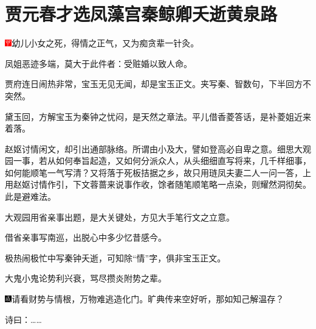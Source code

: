 

\chapter{贾元春才选凤藻宫\hspace{.5em}秦鲸卿夭逝黄泉路}

{\includegraphics[width=3mm]{../Images/00002}\kaishu 幼儿小女之死，得情之正气，又为痴贪辈一针灸。}

{\kaishu 凤姐恶迹多端，莫大于此件者：受赃婚以致人命。}

{\kaishu 贾府连日闹热非常，宝玉无见无闻，却是宝玉正文。夹写秦、智数句，下半回方不突然。}

{\kaishu 黛玉回，方解宝玉为秦钟之忧闷，是天然之章法。平儿借香菱答话，是补菱姐近来着落。}

{\kaishu 赵妪讨情闲文，却引出通部脉络。所谓由小及大，譬如登高必自卑之意。细思大观园一事，若从如何奉旨起造，又如何分派众人，从头细细直写将来，几千样细事，如何能顺笔一气写清？又将落于死板拮据之乡，故只用琏凤夫妻二人一问一答，上用赵妪讨情作引，下文蓉蔷来说事作收，馀者随笔顺笔略一点染，则耀然洞彻矣。此是避难法。}

{\kaishu 大观园用省亲事出题，是大关键处，方见大手笔行文之立意。}

{\kaishu 借省亲事写南巡，出脱心中多少忆昔感今。}

{\kaishu 极热闹极忙中写秦钟夭逝，可知除``情''字，俱非宝玉正文。}

{\kaishu 大鬼小鬼论势利兴衰，骂尽攒炎附势之辈。}

{\includegraphics[width=3mm]{../Images/00005}请看财势与情根，万物难逃造化门。旷典传来空好听，那如知己解温存？}

诗曰：\ldots{}\ldots{}

